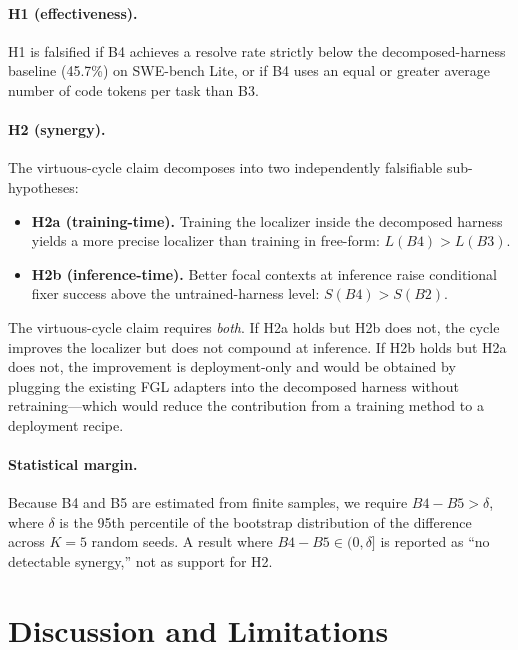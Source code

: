 \documentclass[11pt,a4paper]{article}
\begin{document}
\paragraph{H1 (effectiveness).}
H1 is falsified if B4 achieves a resolve rate strictly below the decomposed-harness baseline (45.7\%) on SWE-bench Lite, or if B4 uses an equal or greater average number of code tokens per task than B3.

\paragraph{H2 (synergy).}
The virtuous-cycle claim decomposes into two independently falsifiable sub-hypotheses:
\begin{itemize}[leftmargin=*, nosep, topsep=2pt, itemsep=2pt]
    \item \textbf{H2a (training-time).} Training the localizer inside the decomposed harness yields a more precise localizer than training in free-form: $L(B4) > L(B3)$.
    \item \textbf{H2b (inference-time).} Better focal contexts at inference raise conditional fixer success above the untrained-harness level: $S(B4) > S(B2)$.
\end{itemize}
The virtuous-cycle claim requires \emph{both}. If H2a holds but H2b does not, the cycle improves the localizer but does not compound at inference. If H2b holds but H2a does not, the improvement is deployment-only and would be obtained by plugging the existing FGL adapters into the decomposed harness without retraining---which would reduce the contribution from a training method to a deployment recipe.

\paragraph{Statistical margin.}
Because B4 and B5 are estimated from finite samples, we require $B4 - B5 > \delta$, where $\delta$ is the 95th percentile of the bootstrap distribution of the difference across $K = 5$ random seeds. A result where $B4 - B5 \in (0, \delta]$ is reported as ``no detectable synergy,'' not as support for H2.

\section{Discussion and Limitations}
\end{document}
